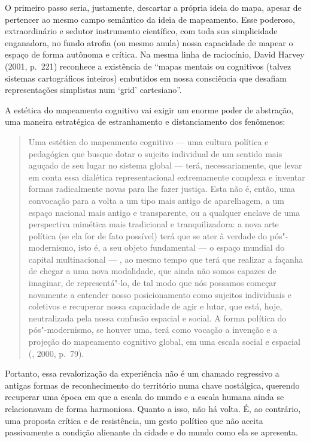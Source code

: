 O primeiro passo seria, justamente, descartar a própria ideia do mapa,
apesar de pertencer ao mesmo campo semântico da ideia de mapeamento.
Esse poderoso, extraordinário e sedutor instrumento científico, com toda
sua simplicidade enganadora, no fundo atrofia (ou mesmo anula) nossa
capacidade de mapear o espaço de forma autônoma e crítica. Na mesma
linha de raciocínio, David Harvey (2001, p.~221) reconhece a existência
de ``mapas mentais ou cognitivos (talvez sistemas cartográficos
inteiros) embutidos em nossa consciência que desafiam representações
simplistas num `grid' cartesiano''.

A estética do mapeamento cognitivo vai exigir um enorme poder de
abstração, uma maneira estratégica de estranhamento e distanciamento dos
fenômenos:

\begin{quote}
Uma estética do mapeamento cognitivo --- uma cultura política e
pedagógica que busque dotar o sujeito individual de um sentido mais
aguçado de seu lugar no sistema global --- terá, necessariamente, que
levar em conta essa dialética representacional extremamente complexa e
inventar formas radicalmente novas para lhe fazer justiça. Esta não é,
então, uma convocação para a volta a um tipo mais antigo de aparelhagem,
a um espaço nacional mais antigo e transparente, ou a qualquer enclave
de uma perspectiva mimética mais tradicional e tranquilizadora: a nova
arte política (se ela for de fato possível) terá que se ater à verdade
do pós"-modernismo, isto é, a seu objeto fundamental --- o espaço mundial
do capital multinacional --- , ao mesmo tempo que terá que realizar a
façanha de chegar a uma nova modalidade, que ainda não somos capazes de
imaginar, de representá"-lo, de tal modo que nós possamos começar
novamente a entender nosso posicionamento como sujeitos individuais e
coletivos e recuperar nossa capacidade de agir e lutar, que está, hoje,
neutralizada pela nossa confusão espacial e social. A forma política do
pós"-modernismo, se houver uma, terá como vocação a invenção e a projeção
do mapeamento cognitivo global, em uma escala social e espacial
(, 2000, p.~79).
\end{quote}

Portanto, essa revalorização da experiência não é um chamado regressivo
a antigas formas de reconhecimento do território numa chave nostálgica,
querendo recuperar uma época em que a escala do mundo e a escala humana
ainda se relacionavam de forma harmoniosa. Quanto a isso, não há volta.
É, ao contrário, uma proposta crítica e de resistência, um gesto
político que não aceita passivamente a condição alienante da cidade e do
mundo como ela se apresenta.

